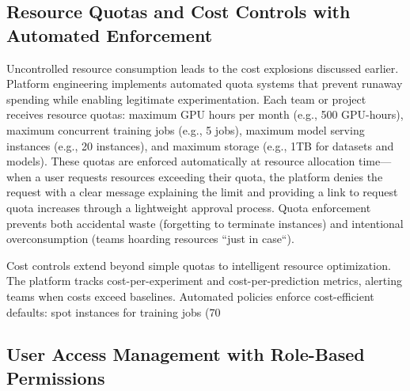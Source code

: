 \subsection{Resource Quotas and Cost Controls with Automated Enforcement}

Uncontrolled resource consumption leads to the cost explosions discussed earlier. Platform engineering implements automated quota systems that prevent runaway spending while enabling legitimate experimentation. Each team or project receives resource quotas: maximum GPU hours per month (e.g., 500 GPU-hours), maximum concurrent training jobs (e.g., 5 jobs), maximum model serving instances (e.g., 20 instances), and maximum storage (e.g., 1TB for datasets and models). These quotas are enforced automatically at resource allocation time---when a user requests resources exceeding their quota, the platform denies the request with a clear message explaining the limit and providing a link to request quota increases through a lightweight approval process. Quota enforcement prevents both accidental waste (forgetting to terminate instances) and intentional overconsumption (teams hoarding resources ``just in case``).

Cost controls extend beyond simple quotas to intelligent resource optimization. The platform tracks cost-per-experiment and cost-per-prediction metrics, alerting teams when costs exceed baselines. Automated policies enforce cost-efficient defaults: spot instances for training jobs (70%

\subsection{User Access Management with Role-Based Permissions}

